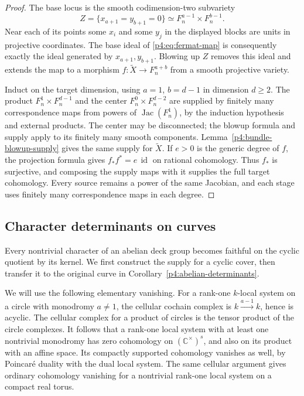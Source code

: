 \documentclass[11pt]{article}
\newcommand{\C}{\mathbb C}
\theoremstyle{plain}
\theoremstyle{definition}
\theoremstyle{remark}
\numberwithin{equation}{section}
\begin{document}
\begin{proof}
The base locus is the smooth codimension-two subvariety
\[
 Z=\{x_{a+1}=y_{b+1}=0\}
   \simeq F_n^{a-1}\times F_n^{b-1}.
\]
Near each of its points some $x_i$ and some $y_j$ in the
displayed blocks are units in projective coordinates.  The base
ideal of \eqref{p4:eq:fermat-map} is consequently exactly the
ideal generated by $x_{a+1},y_{b+1}$.  Blowing up $Z$
removes this ideal and extends the map to a morphism
$f:\widetilde X\to F_n^{a+b}$ from a smooth projective variety.

Induct on the target dimension, using $a=1$, $b=d-1$ in
dimension $d\ge2$.  The product $F_n^1\times F_n^{d-1}$
and the center $F_n^0\times F_n^{d-2}$ are supplied by
finitely many correspondence maps from powers of $\operatorname{Jac}(F_n^1)$,
by the induction hypothesis and external products.
The center may be disconnected; the blowup formula and supply
apply to its finitely many smooth components.
Lemma~\ref{p4:bundle-blowup-supply} gives the same supply for
$\widetilde X$.  If $e>0$ is the generic degree of $f$,
the projection formula gives $f_*f^*=e\,\operatorname{id}$
on rational cohomology.  Thus $f_*$ is surjective, and composing
the supply maps with it supplies the full target cohomology.
Every source remains a power of the same Jacobian, and each
stage uses finitely many correspondence maps in each degree.
\end{proof}

\subsection{Character determinants on curves}

Every nontrivial character of an abelian deck group becomes faithful
on the cyclic quotient by its kernel.  We first construct the supply
for a cyclic cover, then
transfer it to the original curve in
Corollary~\ref{p4:abelian-determinants}.

We will use the following elementary vanishing.  For a rank-one
$k$-local system on a circle with monodromy $a\ne1$, the cellular
cochain complex is $k\xrightarrow{a-1}k$, hence is acyclic.
The cellular complex for a product of circles is the tensor
product of the circle complexes.  It follows that a rank-one
local system with at least one nontrivial monodromy has zero
cohomology on $(\C^\times)^s$, and also on its product with
an affine space.  Its compactly supported cohomology vanishes
as well, by Poincar\'e duality with the dual local system.
The same cellular argument gives ordinary cohomology vanishing
for a nontrivial rank-one local system on a compact real torus.
\end{document}
